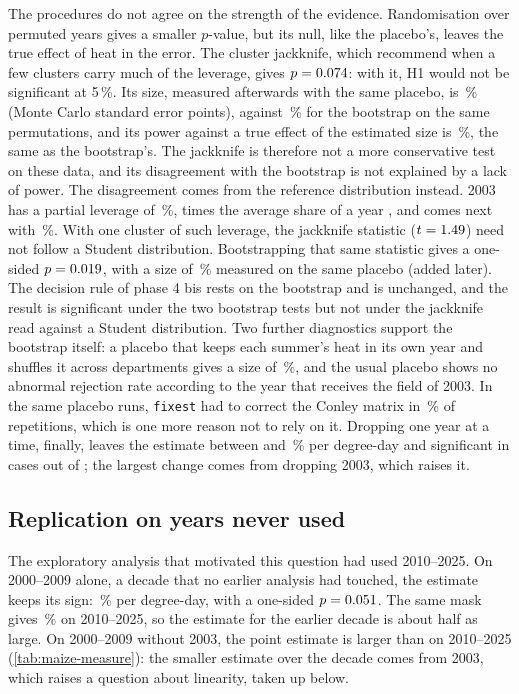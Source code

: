 The procedures do not agree on the strength of the evidence. Randomisation over permuted years gives a smaller $p$-value, but its null, like the placebo's, leaves the true effect of heat in the error. The cluster jackknife, which \textcite{mackinnon2023} recommend when a few clusters carry much of the leverage, gives $p = 0.074$: with it, H1 would not be significant at 5\,\%. Its size, measured afterwards with the same placebo, is \CvThreeSize\,\% (Monte Carlo standard error \CvThreeSizeMc{} points), against \QoneSizeWCR\,\% for the bootstrap on the same permutations, and its power against a true effect of the estimated size is \CvThreePowFull\,\%, the same as the bootstrap's. The jackknife is therefore not a more conservative test on these data, and its disagreement with the bootstrap is not explained by a lack of power. The disagreement comes from the reference distribution instead. 2003 has a partial leverage of \LevThree\,\%, \LevTwoThousandThreeRatio{} times the average share of a year \parencite{mackinnon2023summclust}, and \LevSecondYear{} comes next with \LevSecond\,\%. With one cluster of such leverage, the jackknife statistic ($t = 1.49$) need not follow a Student distribution. Bootstrapping that same statistic \parencite{mackinnon2023jae} gives a one-sided $p = 0.019$, with a size of \CvBootSize\,\% measured on the same placebo (added later). The decision rule of phase 4 bis rests on the bootstrap and is unchanged, and the result is significant under the two bootstrap tests but not under the jackknife read against a Student distribution. Two further diagnostics support the bootstrap itself: a placebo that keeps each summer's heat in its own year and shuffles it across departments gives a size of \WithinYearSize\,\%, and the usual placebo shows no abnormal rejection rate according to the year that receives the field of 2003. In the same placebo runs, \texttt{fixest} had to correct the Conley matrix in \ConleyFixedPct\,\% of repetitions, which is one more reason not to rely on it. Dropping one year at a time, finally, leaves the estimate between \LoyoYearMinPct{} and \LoyoYearMaxPct\,\% per degree-day and significant in \LoyoYearSig{} cases out of \LoyoYearN; the largest change comes from dropping 2003, which raises it.

\subsection{Replication on years never used}
\label{subsec:maize-repl}

The exploratory analysis that motivated this question had used 2010--2025. On 2000--2009 alone, a decade that no earlier analysis had touched, the estimate keeps its sign: \QoneReplPct\,\% per degree-day, with a one-sided $p = 0.051$. The same mask gives \QoneRecentPct\,\% on 2010--2025, so the estimate for the earlier decade is about half as large. On 2000--2009 without 2003, the point estimate is larger than on 2010--2025 (\cref{tab:maize-measure}): the smaller estimate over the decade comes from 2003, which raises a question about linearity, taken up below.

